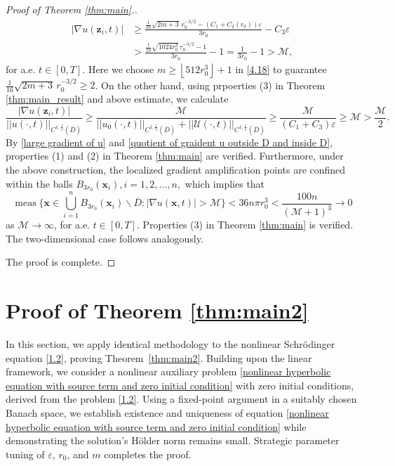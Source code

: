\documentclass[11pt,reqno,oneside]{amsart}
\numberwithin{equation}{section}
\theoremstyle{definition}
\theoremstyle{remark}
\numberwithin{equation}{section}
\begin{document}
\begin{proof}[Proof of Theorem \ref{thm:main}.]
\begin{equation}
			\begin{aligned}
				|\nabla u(\mathbf{z}_i,t)| &\geqslant \frac{
					\tfrac{1}{16}\sqrt{2m+3} \, r_0^{-3/2} - \left(C_1 + C_2(r_0)\right)\varepsilon
				}{3r_0} - C_3\varepsilon\\
				& >\frac{
					\tfrac{1}{16}\sqrt{1024r_0^3} \, r_0^{-3/2} - 1
				}{3r_0} - 1=\frac{1}{3r_0}-1>\mathcal{M},
			\end{aligned}
		\end{equation}
		for a.e. $t \in [0,T]$. Here we choose $m \geqslant \left\lfloor 512 r_0^3 \right\rfloor + 1 $ in \eqref{4.18} to guarantee $\tfrac{1}{16}\sqrt{2m+3} \, r_0^{-3/2}\geqslant 2$. On the other hand, using prpoerties (3) in Theorem \ref{thm:main_result} and above estimate, we calculate 
		\begin{equation}\label{quotient of graident u outside D and inside D}
		\frac{|\nabla u(\mathbf{z}_i,t)|}{||u(\cdot,t)||_{C^{1,\frac{1}{2}}(\overline{D})}}\geqslant \frac{\mathcal{M}}{||u_0(\cdot,t)||_{C^{1,\frac{1}{2}}(\overline{D})}+||\mathcal{U}(\cdot,t)||_{C^{1,\frac{1}{2}}(\overline{D})}}\geqslant \frac{\mathcal{M}}{(C_1+C_3)\varepsilon} \geqslant \mathcal{M}>\frac{\mathcal{M}}{2}.
		\end{equation}
		By \eqref{large gradient of u} and \eqref{quotient of graident u outside D and inside D}, properties (1) and (2)  in Theorem \ref{thm:main} are verified. Furthermore, under the above construction, the localized gradient amplification points are confined within the balls $B_{3r_0}(\mathbf{x}_i),i=1,2,...,n,$ which implies that 
		\begin{equation*}
			\operatorname{meas}\big\{ \mathbf{x} \in \bigcup_{i=1}^{n} B_{3r_0}(\mathbf{x}_i)\backslash \overline{D} :|\nabla u(\mathbf{x},t)|  > \mathcal{M} \big\} < 36n\pi r_0^3 < \frac{100n}{(\mathcal{M} + 1)^3}  \to 0
		\end{equation*}
		as $\mathcal{M} \to \infty$, for a.e. $t \in [0,T]$. Properties (3) in Theorem \ref{thm:main} is verified. The two-dimensional case follows analogously.
		
		The proof is complete.
	\end{proof}
	
	\section{Proof of Theorem \ref{thm:main2}}\label{sec:5}
	
	
	
	In this section, we apply identical methodology to the nonlinear Schr\"odinger equation \eqref{1.2}, proving Theorem~\ref{thm:main2}. Building upon the linear framework, we consider a nonlinear auxiliary problem \eqref{nonlinear hyperbolic equation with source term and zero initial condition} with zero initial conditions, derived from the problem \eqref{1.2}. Using a fixed-point argument in a suitably chosen Banach space, we establish existence and uniqueness of equation \eqref{nonlinear hyperbolic equation with source term and zero initial condition} while demonstrating the solution's H\" older norm remains small. Strategic parameter tuning of $\varepsilon$, $r_0$, and $m$ completes the proof.
	
\end{document}
